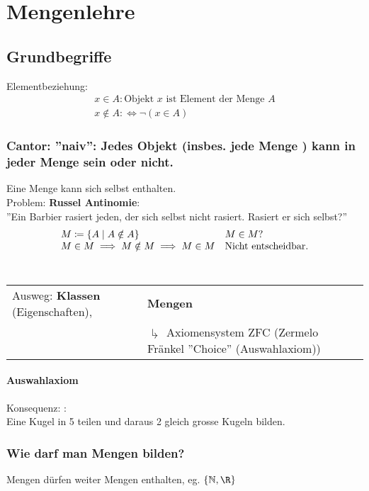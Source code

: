 \chapter{Mengenlehre}
\section{Grundbegriffe}
Elementbeziehung:\\
\begin{gather*}
	x \in A : \text{Objekt } x \text{ ist Element der Menge } A \\
	x \notin A : \iff \neg ( x \in A )
\end{gather*}

\subsection{Cantor: ''naiv'': Jedes Objekt (insbes. jede Menge ) kann in jeder Menge sein oder nicht.}
Eine Menge kann sich selbst enthalten.\\
Problem: \textbf{Russel Antinomie}:\\
''Ein Barbier rasiert jeden, der sich selbst nicht rasiert. Rasiert er sich selbst?'' \\
\begin{gather*}
	\begin{array}{ l l }
		M \coloneqq \{ A \mid A \notin A \}			& M \in M ?				\\
		M \in M \implies M \notin M \implies M \in M	&\text{Nicht entscheidbar.}	
	\end{array}
\end{gather*}\\
\begin{tabular}{ l p{7cm} }
Ausweg: \textbf{Klassen}\index{Klasse} (Eigenschaften),	&\textbf{Mengen}\index{Menge} \\
										& $\drsh$ Axiomensystem ZFC (Zermelo Fränkel ''Choice'' (Auswahlaxiom))
\end{tabular}

\subsubsection{Auswahlaxiom}
Konsequenz: : \\
Eine Kugel in 5 teilen und daraus 2 gleich grosse Kugeln bilden.

\subsection{Wie darf man Mengen bilden?}
Mengen dürfen weiter Mengen enthalten, eg. $\{ \N , \R \}$

